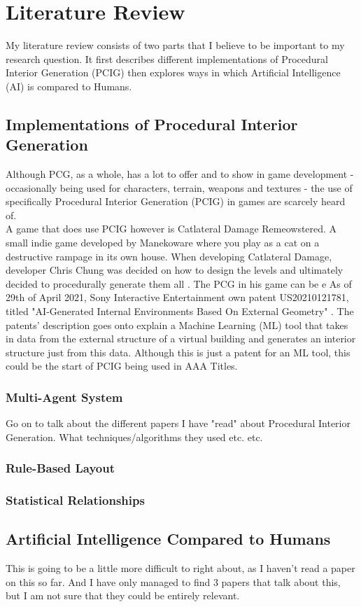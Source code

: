 \section{Literature Review}
My literature review consists of two parts that I believe to be important to my research question.
It first describes different implementations of Procedural Interior Generation (PCIG) then explores
ways in which Artificial Intelligence (AI) is compared to Humans.
\\
\subsection{Implementations of Procedural Interior Generation}
Although PCG, as a whole, has a lot to offer and to show in game development - occasionally being used for
characters, terrain, weapons and textures - the use of specifically Procedural Interior Generation 
(PCIG) in games are scarcely heard  of.
\\
A game that does use PCIG however is Catlateral Damage Remeowstered\cite{game:catlateral}.
A small indie game developed by Manekoware where you play as a cat on a destructive rampage in its own house.
When developing Catlateral Damage, developer Chris Chung was decided on how to design the levels and ultimately decided to procedurally generate them all \cite{pcg_in_gd}.
The PCG in his game can be e
\bigskip
As of 29th of April 2021, Sony Interactive Entertainment own patent US20210121781, 
titled "AI-Generated Internal Environments Based On External Geometry" \cite{sony-patent}.
The patents' description goes onto explain a 
Machine Learning (ML) tool that takes in data from the external structure of a virtual building
and generates an interior structure just from this data.
Although this is just a patent for an ML tool, this could be the start of PCIG being used in AAA Titles. 



\subsubsection*{Multi-Agent System}
Go on to talk about the different papers I have "read" about Procedural Interior Generation.
What techniques/algorithms they used etc. etc. \cite{real-time-walkthroughs}
\subsubsection*{Rule-Based Layout}
\subsubsection*{Statistical Relationships}


\subsection{Artificial Intelligence Compared to Humans}
This is going to be a little more difficult to right about, as I haven't read a paper on this so far.
And I have only managed to find 3 papers that talk about this, but I am not sure that they could be entirely relevant.